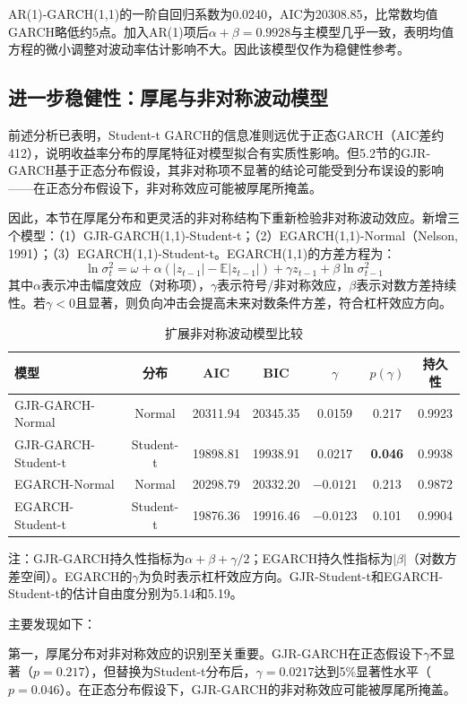 \documentclass[11pt,a4paper]{article}
\begin{document}
AR(1)-GARCH(1,1)的一阶自回归系数为0.0240，AIC为20308.85，比常数均值GARCH略低约5点。加入AR(1)项后\(\alpha+\beta=0.9928\)与主模型几乎一致，表明均值方程的微小调整对波动率估计影响不大。因此该模型仅作为稳健性参考。

\subsection{进一步稳健性：厚尾与非对称波动模型}

前述分析已表明，Student-t GARCH的信息准则远优于正态GARCH（AIC差约412），说明收益率分布的厚尾特征对模型拟合有实质性影响。但5.2节的GJR-GARCH基于正态分布假设，其非对称项不显著的结论可能受到分布误设的影响——在正态分布假设下，非对称效应可能被厚尾所掩盖。

因此，本节在厚尾分布和更灵活的非对称结构下重新检验非对称波动效应。新增三个模型：（1）GJR-GARCH(1,1)-Student-t；（2）EGARCH(1,1)-Normal（Nelson, 1991）；（3）EGARCH(1,1)-Student-t。EGARCH(1,1)的方差方程为：
\[
\ln\sigma_t^2 = \omega + \alpha (|z_{t-1}| - \mathbb{E}|z_{t-1}|) + \gamma z_{t-1} + \beta \ln\sigma_{t-1}^2
\]
其中\(\alpha\)表示冲击幅度效应（对称项），\(\gamma\)表示符号/非对称效应，\(\beta\)表示对数方差持续性。若\(\gamma < 0\)且显著，则负向冲击会提高未来对数条件方差，符合杠杆效应方向。

\begin{table}[ht]
\centering
\caption{扩展非对称波动模型比较}
\begin{tabular}{lcccccc}
\toprule
模型 & 分布 & AIC & BIC & \(\gamma\) & \(p(\gamma)\) & 持久性 \\
\midrule
GJR-GARCH-Normal & Normal & 20311.94 & 20345.35 & 0.0159 & 0.217 & 0.9923 \\
GJR-GARCH-Student-t & Student-t & 19898.81 & 19938.91 & 0.0217 & \textbf{0.046} & 0.9938 \\
EGARCH-Normal & Normal & 20298.79 & 20332.20 & $-0.0121$ & 0.213 & 0.9872 \\
EGARCH-Student-t & Student-t & 19876.36 & 19916.46 & $-0.0123$ & 0.101 & 0.9904 \\
\bottomrule
\end{tabular}
\end{table}

注：GJR-GARCH持久性指标为\(\alpha+\beta+\gamma/2\)；EGARCH持久性指标为\(|\beta|\)（对数方差空间）。EGARCH的\(\gamma\)为负时表示杠杆效应方向。GJR-Student-t和EGARCH-Student-t的估计自由度分别为5.14和5.19。

主要发现如下：

第一，厚尾分布对非对称效应的识别至关重要。GJR-GARCH在正态假设下\(\gamma\)不显著（\(p=0.217\)），但替换为Student-t分布后，\(\gamma=0.0217\)达到5\%显著性水平（\(p=0.046\)）。在正态分布假设下，GJR-GARCH的非对称效应可能被厚尾所掩盖。
\end{document}
